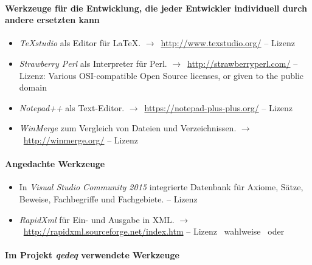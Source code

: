 \documentclass[english,ngerman,parskip=half,headsepline,footsepline]{scrreprt}
\newcounter{Enumi}%
\begin{document}
	\paragraph{Werkzeuge für die Entwicklung, die jeder Entwickler individuell durch andere ersetzten kann}
	\begin{itemize}
		\setcounter{enumi}{\value{Enumi}}

		\item\label{Werkzeug:TeXstudio}\emph{\TeX studio} als Editor für \LaTeX.
		$\rightarrow$~\url{http://www.texstudio.org/} -- Lizenz \seename~\cite{bib:GPLii}

		\item\label{Werkzeug:Perl}\emph{Strawberry Perl} als Interpreter für Perl.
		$\rightarrow$~\url{http://strawberryperl.com/} -- Lizenz: Various OSI-compatible Open Source licenses, or given to the public domain

		\item\label{Werkzeug:Notepadpp}\emph{Notepad++} als Text-Editor.
		$\rightarrow$~\url{https://notepad-plus-plus.org/} -- Lizenz \seename~\cite{bib:GPLi}

		\item\label{Werkzeug:WinMerge}\emph{WinMerge} zum Vergleich von Dateien und Verzeichnissen.
		$\rightarrow$~\url{http://winmerge.org/} -- Lizenz \seename~\cite{bib:GPLi}

		\setcounter{Enumi}{\value{enumi}}
	\end{itemize}

	\paragraph{Angedachte Werkzeuge}
	\begin{itemize}
		\setcounter{enumi}{\value{Enumi}}

		\item\label{Werkzeug:VSC DB}In \emph{Visual Studio Community 2015} integrierte Datenbank für Axiome, Sätze, Beweise, Fachbegriffe und Fachgebiete.
		-- Lizenz \seename~\cite{bib:EULA}

		\item\label{Werkzeug:RapidXml}\emph{RapidXml} für Ein- und Ausgabe in XML.
		$\rightarrow$~\url{http://rapidxml.sourceforge.net/index.htm} -- Lizenz \seename\ wahlweise~\cite{bib:BSLi} oder~\cite{bib:MIT}

	\end{itemize}

	\paragraph{Im Projekt \emph{qedeq} verwendete Werkzeuge}
\end{document}
